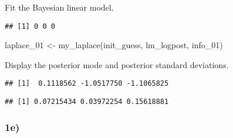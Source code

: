 \documentclass[
]{article}
\newenvironment{Shaded}{\begin{snugshade}}{\end{snugshade}}
\newcommand{\DecValTok}[1]{\textcolor[rgb]{0.00,0.00,0.81}{#1}}
\newcommand{\DocumentationTok}[1]{\textcolor[rgb]{0.56,0.35,0.01}{\textbf{\textit{#1}}}}
\newcommand{\FunctionTok}[1]{\textcolor[rgb]{0.00,0.00,0.00}{#1}}
\newcommand{\NormalTok}[1]{#1}
\newcommand{\OtherTok}[1]{\textcolor[rgb]{0.56,0.35,0.01}{#1}}
\newcommand{\SpecialCharTok}[1]{\textcolor[rgb]{0.00,0.00,0.00}{#1}}
\begin{document}
Fit the Bayesian linear model.

\begin{Shaded}
\end{Shaded}

\begin{verbatim}
## [1] 0 0 0
\end{verbatim}

\begin{Shaded}
\begin{Highlighting}[]
\NormalTok{laplace\_01 }\OtherTok{\textless{}{-}} \FunctionTok{my\_laplace}\NormalTok{(init\_guess, lm\_logpost, info\_01)}
\end{Highlighting}
\end{Shaded}

Display the posterior mode and posterior standard deviations.

\begin{Shaded}
\end{Shaded}

\begin{verbatim}
## [1]  0.1118562 -1.0517750 -1.1065825
\end{verbatim}

\begin{Shaded}
\end{Shaded}

\begin{verbatim}
## [1] 0.07215434 0.03972254 0.15618881
\end{verbatim}

\hypertarget{e}{%
\subsubsection{1e)}\label{e}}
\end{document}
